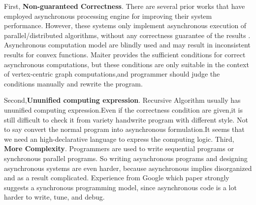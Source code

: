 First, \textbf{Non-guaranteed Correctness}. There are several prior works that have employed asynchronous processing engine for improving their system performance. However, these systems only implement asynchronous execution of parallel/distributed algorithms, without any correctness guarantee of the results \cite{Low:2012:DGF:2212351.2212354}. Asynchronous computation model are blindly used and may result in inconsistent results for convex functions. Maiter \cite{maiter} provides the sufficient conditions for correct asynchronous computations, but these conditions are only suitable in the context of vertex-centric graph computations,and programmer should judge the conditions manually and rewrite the program.

Second,\textbf{Ununified computing expression}.
Recursive Algorithm usually has ununified computing expression.Even if the correctness condition are given,it is still difficult to check it from variety handwrite program with different style. Not to say convert the normal program into asynchronous formulation.It seems that we need an high-declarative language to express the computing logic.
Third, \textbf{More Complexity}. Programmers are used to write sequential programs or synchronous parallel programs. So writing asynchronous programs and designing asynchronous systems are even harder, because asynchronous implies disorganized and as a result complicated. Experience from Google \cite{}{\color{red}which paper} strongly suggests a synchronous programming model, since asynchronous code is a lot harder to write, tune, and debug.




